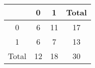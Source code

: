 \begin{tabular}{|c|c|c|c|}
\hline
 & 0 & 1 & Total \\
\hline
0 & 6 & 11 & 17 \\
1 & 6 & 7 & 13 \\
\hline
Total & 12 & 18 & 30 \\
\hline
\end{tabular}
